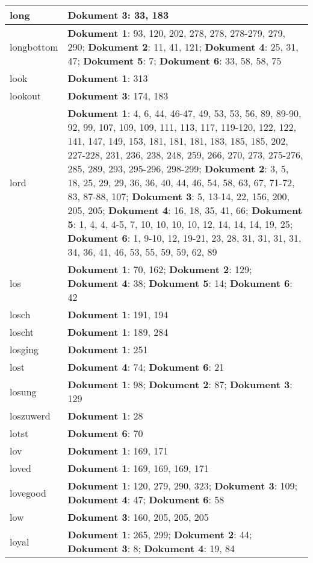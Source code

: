 \documentclass[a5paper]{article}
\begin{document}
\begin{longtable}[l]{|l|p{3in}|}
\hline
long & \textbf{Dokument 3}: 33, 183 \\
\hline
longbottom & \textbf{Dokument 1}: 93, 120, 202, 278, 278, 278-279, 279, 290; \textbf{Dokument 2}: 11, 41, 121; \textbf{Dokument 4}: 25, 31, 47; \textbf{Dokument 5}: 7; \textbf{Dokument 6}: 33, 58, 58, 75 \\
\hline
look & \textbf{Dokument 1}: 313 \\
\hline
lookout & \textbf{Dokument 3}: 174, 183 \\
\hline
lord & \textbf{Dokument 1}: 4, 6, 44, 46-47, 49, 53, 53, 56, 89, 89-90, 92, 99, 107, 109, 109, 111, 113, 117, 119-120, 122, 122, 141, 147, 149, 153, 181, 181, 181, 183, 185, 185, 202, 227-228, 231, 236, 238, 248, 259, 266, 270, 273, 275-276, 285, 289, 293, 295-296, 298-299; \textbf{Dokument 2}: 3, 5, 18, 25, 29, 29, 36, 36, 40, 44, 46, 54, 58, 63, 67, 71-72, 83, 87-88, 107; \textbf{Dokument 3}: 5, 13-14, 22, 156, 200, 205, 205; \textbf{Dokument 4}: 16, 18, 35, 41, 66; \textbf{Dokument 5}: 1, 4, 4, 4-5, 7, 10, 10, 10, 10, 12, 14, 14, 14, 19, 25; \textbf{Dokument 6}: 1, 9-10, 12, 19-21, 23, 28, 31, 31, 31, 31, 34, 36, 41, 46, 53, 55, 59, 59, 62, 89 \\
\hline
los & \textbf{Dokument 1}: 70, 162; \textbf{Dokument 2}: 129; \textbf{Dokument 4}: 38; \textbf{Dokument 5}: 14; \textbf{Dokument 6}: 42 \\
\hline
losch & \textbf{Dokument 1}: 191, 194 \\
\hline
loscht & \textbf{Dokument 1}: 189, 284 \\
\hline
losging & \textbf{Dokument 1}: 251 \\
\hline
lost & \textbf{Dokument 4}: 74; \textbf{Dokument 6}: 21 \\
\hline
losung & \textbf{Dokument 1}: 98; \textbf{Dokument 2}: 87; \textbf{Dokument 3}: 129 \\
\hline
loszuwerd & \textbf{Dokument 1}: 28 \\
\hline
lotst & \textbf{Dokument 6}: 70 \\
\hline
lov & \textbf{Dokument 1}: 169, 171 \\
\hline
loved & \textbf{Dokument 1}: 169, 169, 169, 171 \\
\hline
lovegood & \textbf{Dokument 1}: 120, 279, 290, 323; \textbf{Dokument 3}: 109; \textbf{Dokument 4}: 47; \textbf{Dokument 6}: 58 \\
\hline
low & \textbf{Dokument 3}: 160, 205, 205, 205 \\
\hline
loyal & \textbf{Dokument 1}: 265, 299; \textbf{Dokument 2}: 44; \textbf{Dokument 3}: 8; \textbf{Dokument 4}: 19, 84 \\

\end{longtable}
\end{document}
